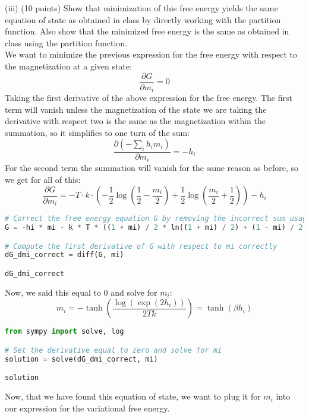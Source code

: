 \documentclass[12pt]{article}
\begin{document}
(iii) (10 points) Show that minimization of this free energy yields the same equation of state as obtained in class by directly working with the partition function. Also show that the minimized free energy is the same as obtained in class using the partition function.\\
We want to minimize the previous expression for the free energy with respect to the magnetization at a given state:
\begin{equation}
\frac{\partial G}{\partial m_i}=0
\end{equation}
Taking the first derivative of the above expression for the free energy. The first term will vanish unless the magnetization of the state we are taking the derivative with respect two is the same as the magnetization within the summation, so it simplifies to one turn of the sum:
\begin{equation}
\frac{\partial (-\sum_i h_i m_i)}{\partial m_i}=-h_i
\end{equation}
For the second term the summation will vanish for the same reason as before, so we get for all of this:
\begin{equation}
\frac{\partial G}{\partial m_i}=-T \cdot k \cdot\left(-\frac{1}{2} \log \left(\frac{1}{2}-\frac{m_i}{2}\right)+\frac{1}{2} \log \left(\frac{m_i}{2}+\frac{1}{2}\right)\right)-h_i
\end{equation}
\begin{lstlisting}[language=Python]
# Correct the free energy equation G by removing the incorrect sum usage
G = -hi * mi - k * T * ((1 + mi) / 2 * ln((1 + mi) / 2) + (1 - mi) / 2 * ln((1 - mi) / 2))

# Compute the first derivative of G with respect to mi correctly
dG_dmi_correct = diff(G, mi)

dG_dmi_correct
\end{lstlisting}
Now, we said this equal to 0 and solve for $m_i$:
\begin{equation}
m_i=-\tanh \left(\frac{\log \left(\exp \left(2 h_i\right)\right)}{2 T k}\right) = \tanh \left(\beta h_i\right)
\end{equation}
\begin{lstlisting}[language=Python]
from sympy import solve, log

# Set the derivative equal to zero and solve for mi
solution = solve(dG_dmi_correct, mi)

solution
\end{lstlisting}
Now, that we have found this equation of state, we want to plug it for $m_i$ into our expression for the variational free energy. 
\end{document}
